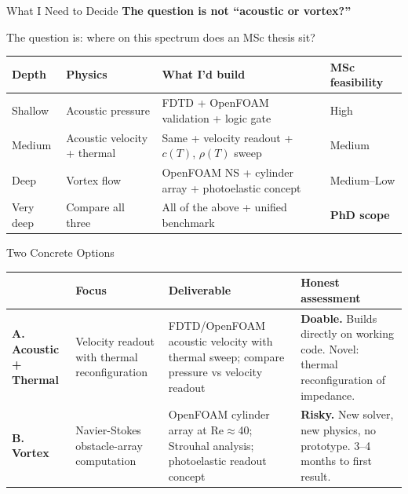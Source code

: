 \documentclass[aspectratio=169,11pt]{beamer}
\newcommand{\cmark}{\ding{51}}
\begin{document}
\begin{frame}{What I Need to Decide}
  \textbf{The question is not ``acoustic or vortex?''}

  \vspace{0.3cm}
  \begin{center}
    \textcolor{gdpPurple}{\large The question is: where on this spectrum does an MSc thesis sit?}
  \end{center}

  \vspace{0.3cm}
  \footnotesize
  \begin{table}
    \centering
    \renewcommand{\arraystretch}{1.1}
    \begin{tabular}{@{}>{\raggedright}p{2.2cm}>{\raggedright}p{3.8cm}>{\raggedright}p{4.5cm}>{\raggedright\arraybackslash}p{2.8cm}@{}}
      \toprule
      \textbf{Depth} & \textbf{Physics} & \textbf{What I'd build} & \textbf{MSc feasibility} \\
      \midrule
      Shallow & Acoustic pressure & FDTD + OpenFOAM validation + logic gate & High \cmark \\
      Medium & Acoustic velocity + thermal & Same + velocity readout + $c(T)$, $\rho(T)$ sweep & Medium \\
      Deep & Vortex flow & OpenFOAM NS + cylinder array + photoelastic concept & Medium--Low \\
      Very deep & Compare all three & All of the above + unified benchmark & \textbf{PhD scope} \\
      \bottomrule
    \end{tabular}
  \end{table}
\end{frame}

\begin{frame}{Two Concrete Options}
  \footnotesize
  \begin{table}
    \centering
    \renewcommand{\arraystretch}{1.15}
    \begin{tabular}{@{}>{\raggedright}p{1.8cm}>{\raggedright}p{3.8cm}>{\raggedright}p{4.5cm}>{\raggedright\arraybackslash}p{3.2cm}@{}}
      \toprule
      & \textbf{Focus} & \textbf{Deliverable} & \textbf{Honest assessment} \\
      \midrule
      \textbf{A. Acoustic + Thermal} & Velocity readout with thermal reconfiguration & FDTD/OpenFOAM acoustic velocity with thermal sweep; compare pressure vs velocity readout & \textbf{Doable.} Builds directly on working code. Novel: thermal reconfiguration of impedance. \\
      \midrule
      \textbf{B. Vortex} & Navier-Stokes obstacle-array computation & OpenFOAM cylinder array at Re$\approx$40; Strouhal analysis; photoelastic readout concept & \textbf{Risky.} New solver, new physics, no prototype. 3--4 months to first result. \\
      \bottomrule
    \end{tabular}
  \end{table}
\end{frame}
\end{document}
